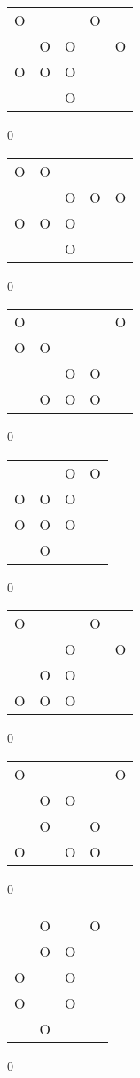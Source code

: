\begin{tabular}{|m{0.2cm}m{0.2cm}m{0.2cm}m{0.2cm}m{0.2cm}|}\hline
O& & &O& \\
 &O&O& &O\\
O&O&O& & \\
 & &O& & \\
\hline\end{tabular}0
\begin{tabular}{|m{0.2cm}m{0.2cm}m{0.2cm}m{0.2cm}m{0.2cm}|}\hline
O&O& & & \\
 & &O&O&O\\
O&O&O& & \\
 & &O& & \\
\hline\end{tabular}0
\begin{tabular}{|m{0.2cm}m{0.2cm}m{0.2cm}m{0.2cm}m{0.2cm}|}\hline
O& & & &O\\
O&O& & & \\
 & &O&O& \\
 &O&O&O& \\
\hline\end{tabular}0
\begin{tabular}{|m{0.2cm}m{0.2cm}m{0.2cm}m{0.2cm}|}\hline
 & &O&O\\
O&O&O& \\
O&O&O& \\
 &O& & \\
\hline\end{tabular}0
\begin{tabular}{|m{0.2cm}m{0.2cm}m{0.2cm}m{0.2cm}m{0.2cm}|}\hline
O& & &O& \\
 & &O& &O\\
 &O&O& & \\
O&O&O& & \\
\hline\end{tabular}0
\begin{tabular}{|m{0.2cm}m{0.2cm}m{0.2cm}m{0.2cm}m{0.2cm}|}\hline
O& & & &O\\
 &O&O& & \\
 &O& &O& \\
O& &O&O& \\
\hline\end{tabular}0
\begin{tabular}{|m{0.2cm}m{0.2cm}m{0.2cm}m{0.2cm}|}\hline
 &O& &O\\
 &O&O& \\
O& &O& \\
O& &O& \\
 &O& & \\
\hline\end{tabular}0
